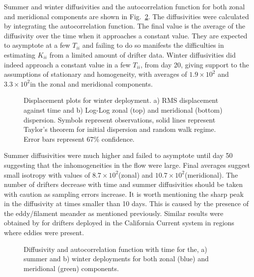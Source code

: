 Summer and winter diffusivities and the autocorrelation function
for both zonal and meridional components are shown in
Fig.~\ref{fig:drf_diff}. The diffusivities were calculated by
integrating the autocorrelation function. The final value is the
average of the diffusivity over the time when it approaches a
constant value. They are expected to asymptote at a few $T_{ii}$
and failing to do so manifests the difficulties in estimating
$K_{ii}$ from a limited amount of drifter data. Winter
diffusivities did indeed approach a constant value in a few
$T_{ii}$, from day 20, giving support to the assumptions of
stationary and homogeneity, with averages of $1.9\times10^2$\mix
and $3.3\times10^2$\mix in the zonal and meridional components.
\begin{figure}
\centering %
\caption{Displacement plots for winter deployment. a) RMS
displacement against time and b) Log-Log zonal (top) and
meridional (bottom) dispersion. Symbols represent observations,
solid lines represent Taylor's theorem for initial dispersion and
random walk regime. Error bars represent 67\% confidence.}
\label{fig:drf_winterrms}%
\end{figure}
Summer diffusivities were much higher and failed to asymptote
until day 50 suggesting that the inhomogeneities in the flow were
large. Final averages suggest small isotropy with values of
$8.7\times10^2$\mix (zonal) and $10.7\times10^2$\mix (meridional).
The number of drifters decrease with time and summer diffusivities
should be taken with caution as sampling errors increase. It is
worth mentioning the sharp peak in the diffusivity at times
smaller than 10 days. This is caused by the presence of the
eddy/filament meander as mentioned previously. Similar results
were obtained by \citet{Swenson96} for drifters deployed in the
California Current system in regions where eddies were present.


\begin{figure}
\centering %
\caption{Diffusivity and autocorrelation function with time for
the, a) summer and b) winter deployments for both zonal (blue) and
meridional (green) components.}
\label{fig:drf_diff}%
\end{figure}

